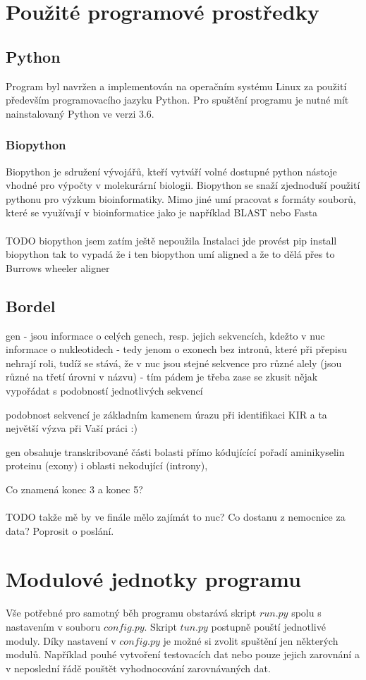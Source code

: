 \documentclass[czech,DP]{thesiskiv}
\numberwithin{equation}{section}
\begin{document}
\section{Použité programové prostředky}
\subsection{Python}
Program byl navržen a implementován na operačním systému Linux za použití především programovacího jazyku Python. 
 Pro spuštění programu je nutné mít nainstalovaný Python ve verzi 3.6.
\subsubsection{Biopython}
Biopython je sdružení vývojářů, kteří vytváří volné dostupné python nástoje vhodné pro výpočty v molekurární biologii. Biopython se snaží zjednoduší použití pythonu pro výzkum bioinformatiky. Mimo jiné umí pracovat s formáty souborů, které se využívají v bioinformatice jako je například BLAST nebo Fasta  
\\
\\
TODO
biopython jsem zatím ještě nepoužila
Instalaci jde provést pip install biopython
tak to vypadá že i ten biopython umí aligned a že to dělá přes to Burrows wheeler aligner 

\subsection{Bordel}
gen - jsou informace o celých genech, resp. jejich sekvencích, kdežto v nuc informace o nukleotidech - tedy jenom o exonech bez intronů, které při přepisu nehrají roli, tudíž se stává, že v nuc jsou stejné sekvence pro různé alely (jsou různé na třetí úrovni v názvu) - tím pádem je třeba zase se zkusit nějak vypořádat s podobností jednotlivých sekvencí

podobnost sekvencí je základním kamenem úrazu při identifikaci KIR a ta největší výzva při Vaší práci :)

gen obsahuje transkribované části bolasti přímo kódujícící pořadí aminikyselin proteinu (exony) i oblasti nekodující (introny), 

Co znamená konec 3 a konec 5? 
\\
\\
TODO takže mě by ve finále mělo zajímát to nuc? Co dostanu z nemocnice za data? Poprosit o poslání. 



\section{Modulové jednotky programu}
Vše potřebné pro samotný běh programu obstarává skript $run.py$ spolu s nastavením v souboru $config.py$. Skript $tun.py$ postupně pouští jednotlivé moduly. Díky nastavení v $config.py$ je možné si zvolit spuštění jen některých modulů. Například pouhé vytvoření testovacích dat nebo pouze jejich zarovnání a v neposlední řádě pouštět vyhodnocování zarovnávaných dat.
\end{document}
